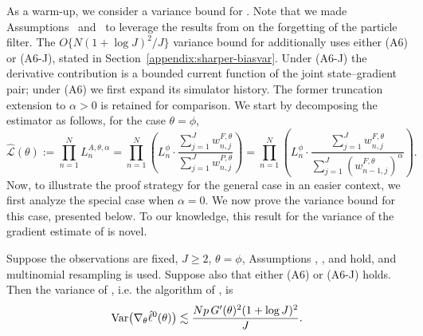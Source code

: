 As a warm-up, we consider a variance bound for .
Note that we made Assumptions~{} and~{} to leverage the results from \cite{karjalainen23} on the forgetting of the particle filter. 
The $O\{N(1+\log J)^2/J\}$ variance bound for  additionally uses either (A6)
or (A6-J), stated in Section~\ref{appendix:sharper-biasvar}. Under
(A6-J) the derivative contribution is a bounded current function of the
joint state--gradient pair; under (A6) we first expand its simulator
history. The former truncation extension to $\alpha>0$ is retained for
comparison.
We start by decomposing the  estimator as follows, for the case $\theta=\phi$,
\begin{equation}
\hat{\mathcal{L}}(\theta):=\prod_{n=1}^N L_n^{A, \theta, \alpha}=\prod_{n=1}^N\left(L_n^\phi \cdot \frac{\sum_{j=1}^J w_{n, j}^{F, \theta}}{\sum_{j=1}^J w_{n, j}^{P, \theta}}\right)=\prod_{n=1}^N\left(L_n^\phi \cdot \frac{\sum_{j=1}^J w_{n, j}^{F, \theta}}{\sum_{j=1}^J (w_{n-1, j}^{F, \theta})^\alpha}\right).
\end{equation}
Now, to illustrate the proof strategy for the general case in an easier context, we first analyze the special case when $\alpha=0$.
We now prove the variance bound for this case, presented below. To our knowledge, this result for the variance of the gradient estimate of \cite{naesseth18} is novel. 
\begin{thm}[Variance of \aigen{Algorithm~\ref{alg:mop} ($\alpha=0$)} Gradient Estimate]
Suppose the observations are fixed, $J\geq2$, $\theta=\phi$, Assumptions
{}, {}, and
{} hold, and multinomial resampling is
used. Suppose also that either (A6) or (A6-J) holds. Then the variance of , i.e.
the algorithm of \cite{naesseth18}, is
 \begin{equation}
     \mathrm{Var}\big(\nabla_\theta \hat\ell^0(\theta)\big) \lesssim \frac{Np \, G'(\theta)^2(1+\log J)^2}{J}.
 \end{equation}
\end{thm}
